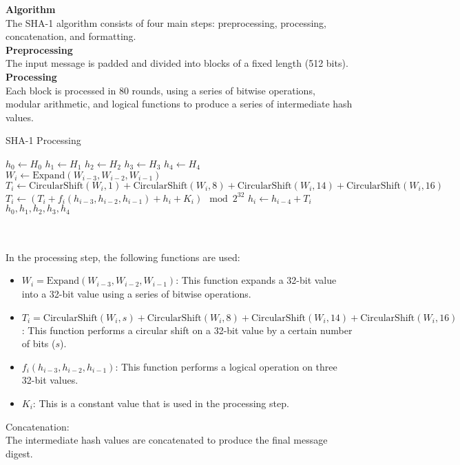 \documentclass[11pt]{article}
\begin{document}
\textbf{Algorithm}\\
The SHA-1 algorithm consists of four main steps: preprocessing, processing, concatenation, and formatting.\\
\textbf{Preprocessing}\\
The input message is padded and divided into blocks of a fixed length (512 bits).\\
\textbf{Processing}\\
Each block is processed in 80 rounds, using a series of bitwise operations, modular arithmetic, and logical functions to produce a series of intermediate hash values.\\
\begin{algorithm}
\caption{SHA-1 Processing}
\begin{algorithmic}[1]
\State $h_0 \gets H_0$
\State $h_1 \gets H_1$
\State $h_2 \gets H_2$
\State $h_3 \gets H_3$
\State $h_4 \gets H_4$
\State $W_i \gets \text{Expand}(W_{i-3}, W_{i-2}, W_{i-1})$
\State $T_i \gets \text{CircularShift}(W_i, 1) + \text{CircularShift}(W_i, 8) + \text{CircularShift}(W_i, 14) + \text{CircularShift}(W_i, 16)$
\State $T_i \gets (T_i + f_i(h_{i-3}, h_{i-2}, h_{i-1}) + h_i + K_i) \mod 2^{32}$
\State $h_i \gets h_{i-4} + T_i$
\EndFor
\State \Return $h_0, h_1, h_2, h_3, h_4$
\EndProcedure
\end{algorithmic}
\end{algorithm}\\\\
In the processing step, the following functions are used:
\begin{itemize}
\item $W_i = \text{Expand}(W_{i-3}, W_{i-2}, W_{i-1})$: This function expands a 32-bit value into a 32-bit value using a series of bitwise operations.
\item $T_i = \text{CircularShift}(W_i, s) + \text{CircularShift}(W_i, 8) + \text{CircularShift}(W_i, 14) + \text{CircularShift}(W_i, 16)$: This function performs a circular shift on a 32-bit value by a certain number of bits ($s$).
\item $f_i(h_{i-3}, h_{i-2}, h_{i-1})$: This function performs a logical operation on three 32-bit values.
\item $K_i$: This is a constant value that is used in the processing step.
\end{itemize}
Concatenation:\\
The intermediate hash values are concatenated to produce the final message digest.\\\\
\end{document}
